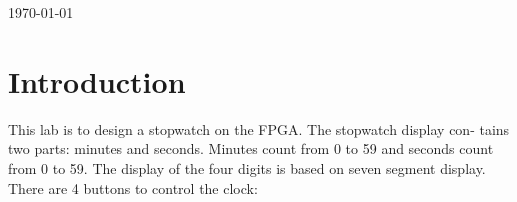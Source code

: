 \documentclass[12pt]{article}
\begin{document}
\begin{titlepage}

{\large \today}\\[2cm] %


 

\vfill %

\end{titlepage}

\newpage
\section*{Introduction}
This lab is to design a stopwatch on the FPGA. The stopwatch display con- tains two parts: minutes and seconds. Minutes count from 0 to 59 and seconds count from 0 to 59. The display of the four digits is based on seven segment display. There are 4 buttons to control the clock:
\end{document}
